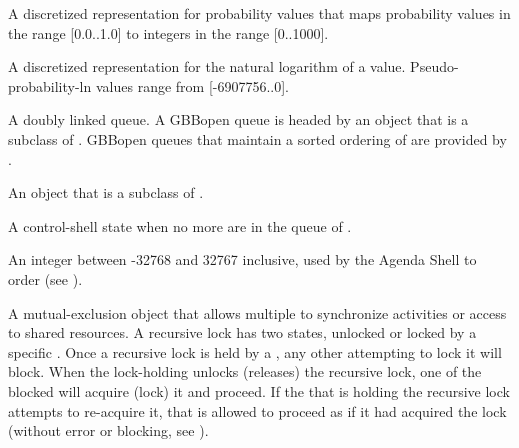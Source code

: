 \begin{glossary-list}
A discretized  representation for probability values that
maps probability values in the range [0.0..1.0] to integers in the range
[0..1000].



A discretized  representation for the natural logarithm
of a  value.  Pseudo-probability-ln values range
from [-6907756..0].


\glent[queue]
%
%
A doubly linked queue.  A GBBopen queue is headed by an object that is a
subclass of \textbf{}.  GBBopen queues that maintain a
sorted ordering of  are provided by
.


%
%
%
An object that is a subclass of .


\glent[quiescence]
%
%
A control-shell state when no more  are in the queue of
.


\glent[rating]
%
An integer between -32768 and 32767 inclusive, used by the Agenda Shell to
order  (see \textbf{}).


%
%
%
%
%
A mutual-exclusion object that allows multiple  to synchronize
activities or access to shared resources. A recursive lock has two states,
unlocked or locked by a specific . Once a recursive lock is held
by a , any other  attempting to lock it will
block. When the lock-holding  unlocks (releases) the recursive
lock, one of the blocked  will acquire (lock) it and proceed.
If the  that is holding the recursive lock attempts to
re-acquire it, that  is allowed to proceed as if it had acquired
the lock (without error or blocking, see ).


\end{glossary-list}
